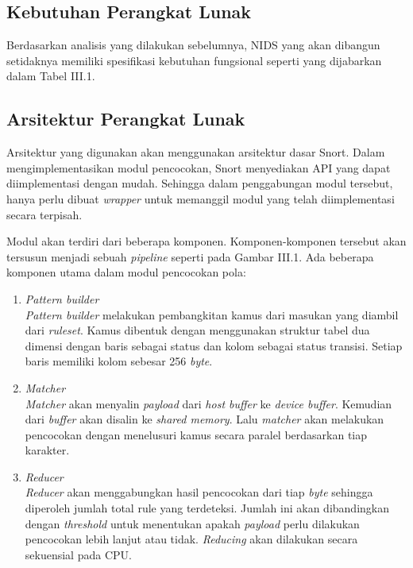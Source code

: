     \subsection{Kebutuhan Perangkat Lunak}

      Berdasarkan analisis yang dilakukan sebelumnya, NIDS yang akan dibangun setidaknya memiliki spesifikasi kebutuhan fungsional seperti yang dijabarkan dalam Tabel III.1.
      
      



    \subsection{Arsitektur Perangkat Lunak}

      Arsitektur yang digunakan akan menggunakan arsitektur dasar Snort. Dalam mengimplementasikan modul pencocokan, Snort menyediakan API yang dapat diimplementasi dengan mudah. Sehingga dalam penggabungan modul tersebut, hanya perlu dibuat \emph{wrapper} untuk memanggil modul yang telah diimplementasi secara terpisah.

      Modul akan terdiri dari beberapa komponen. Komponen-komponen tersebut akan tersusun menjadi sebuah \emph{pipeline} seperti pada Gambar III.1. Ada beberapa komponen utama dalam modul pencocokan pola:

      
      
      \begin{enumerate}

        \item 
        \emph{Pattern builder} \\
        \emph{Pattern builder} melakukan pembangkitan kamus dari masukan yang diambil dari \emph{ruleset}. Kamus dibentuk dengan menggunakan struktur tabel dua dimensi dengan baris sebagai status dan kolom sebagai status transisi. Setiap baris memiliki kolom sebesar 256 \emph{byte}.

        \item
        \emph{Matcher} \\
        \emph{Matcher} akan menyalin \emph{payload} dari \emph{host buffer} ke \emph{device buffer}. Kemudian dari \emph{buffer} akan disalin ke \emph{shared memory}. Lalu \emph{matcher} akan melakukan pencocokan dengan menelusuri kamus secara paralel berdasarkan tiap karakter.

        \item
        \emph{Reducer} \\
        \emph{Reducer} akan menggabungkan hasil pencocokan dari tiap \emph{byte} sehingga diperoleh jumlah total rule yang terdeteksi. Jumlah ini akan dibandingkan dengan \emph{threshold} untuk menentukan apakah \emph{payload} perlu dilakukan pencocokan lebih lanjut atau tidak. \emph{Reducing} akan dilakukan secara sekuensial pada CPU.
        
      \end{enumerate}

